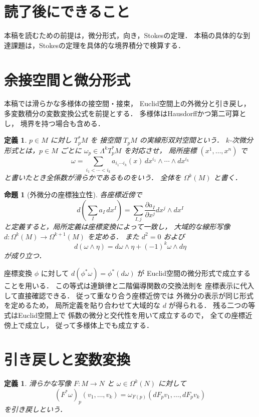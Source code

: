 \documentclass[a5paper,10pt,onecolumn]{jsarticle}
\makeatletter
\theoremstyle{mathnotetheorem}
\newtheorem{definition}[theorem]{定義}
\newtheorem{proposition}[theorem]{命題}
\renewcommand{\proofname}{証明}
\renewenvironment{proof}[1][\proofname]{%
  \par\pushQED{\qed}\normalfont\topsep4\p@\@plus2\p@\relax
  \trivlist\item[\hskip\labelsep\bfseries #1]\ignorespaces
}{\popQED\endtrivlist\@endpefalse}
\makeatother
\begin{document}
\section*{読了後にできること}
本稿を読むための前提は，微分形式，向き，Stokesの定理．
本稿の具体的な到達課題は，Stokesの定理を具体的な境界積分で検算する．

\section{余接空間と微分形式}

本稿では滑らかな多様体の接空間・接束，
Euclid空間上の外微分と引き戻し，
多変数積分の変数変換公式を前提とする．
多様体はHausdorffかつ第二可算とし，
境界を持つ場合も含める．

\begin{definition}
$p\in M$ に対し $T_p^*M$ を
接空間 $T_pM$ の実線形双対空間という．
$k$-次微分形式とは，$p\in M$ ごとに
$\omega_p\in\Lambda^kT_p^*M$ を対応させ，
局所座標 $(x^1,\dots,x^n)$ で
\[
 \omega=\sum_{i_1<\cdots<i_k}
 a_{i_1\cdots i_k}(x)\,
 dx^{i_1}\wedge\cdots\wedge dx^{i_k}
\]
と書いたとき全係数が滑らかであるものをいう．
全体を $\Omega^k(M)$ と書く．
\end{definition}

\begin{proposition}[外微分の座標独立性]
\label{prop:d-global}
各座標近傍で
\[
 d\left(\sum_Ia_I\,dx^I\right)
 =\sum_{I,j}\frac{\partial a_I}{\partial x^j}
 dx^j\wedge dx^I
\]
と定義すると，局所定義は座標変換によって一致し，
大域的な線形写像
$d:\Omega^k(M)\to\Omega^{k+1}(M)$ を定める．
また
$d^2=0$ および
\[
 d(\omega\wedge\eta)
 =d\omega\wedge\eta+(-1)^k\omega\wedge d\eta
\]
が成り立つ．
\end{proposition}
\begin{proof}
座標変換 $\phi$ に対して
$d(\phi^*\omega)=\phi^*(d\omega)$ が
Euclid空間の微分形式で成立することを用いる．
この等式は連鎖律と二階偏導関数の交換法則を
座標表示に代入して直接確認できる．
従って重なり合う座標近傍では
外微分の表示が同じ形式を定めるため，
局所定義を貼り合わせて大域的な $d$ が得られる．
残る二つの等式はEuclid空間上で
係数の微分と交代性を用いて成立するので，
全ての座標近傍上で成立し，
従って多様体上でも成立する．
\end{proof}

\section{引き戻しと変数変換}

\begin{definition}
滑らかな写像 $F:M\to N$ と
$\omega\in\Omega^k(N)$ に対して
\[
 (F^*\omega)_p(v_1,\dots,v_k)
 =\omega_{F(p)}(dF_pv_1,\dots,dF_pv_k)
\]
を引き戻しという．
\end{definition}
\end{document}
